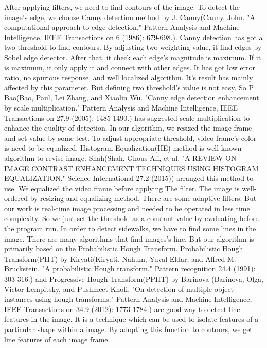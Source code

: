 {After applying filters, we need to find contours of the image. To detect the image's edge, we choose Canny detection method by J. Canny(Canny, John. "A computational approach to edge detection." Pattern Analysis and Machine Intelligence, IEEE Transactions on 6 (1986): 679-698.). Canny detection has got a two threshold to find contours. By adjusting two weighting value, it find edges by Sobel edge detector. After that, it check each edge's magnitude is maximum. If it is maximum, it only apply it and connect with other edges. It has got low error ratio, no spurious response, and well localized algorithm. It's result has mainly affected by this parameter. But defining two threshold's value is not easy. So P Bao(Bao, Paul, Lei Zhang, and Xiaolin Wu. "Canny edge detection enhancement by scale multiplication." Pattern Analysis and Machine Intelligence, IEEE Transactions on 27.9 (2005): 1485-1490.) has suggested scale multiplication to enhance the quality of detection. In our algorithm, we resized the image frame and set value by some test.\newline
To adjust appropriate threshold, video frame's color is need to be equalized. Histogram Equalization(HE) method is well known algorithm to revise image. Shah(Shah, Ghous Ali, et al. "A REVIEW ON IMAGE CONTRAST ENHANCEMENT TECHNIQUES USING HISTOGRAM EQUALIZATION." Science International 27.2 (2015)) arranged this method to use. We equalized the video frame before applying The filter. The image is well-ordered by resizing and equalizing method. There are some adaptive filters. But our work is real-time image processing and needed to be operated in less time complexity. So we just set the threshold as a constant value by evaluating before the program run. \newline
In order to detect sidewalks, we have to find some lines in the image. There are many algorithms that find images's line. But our algorithm is primarily based on the Probabilistic Hough Transform. Probabilistic Hough Transform(PHT) by Kiryati(Kiryati, Nahum, Yuval Eldar, and Alfred M. Bruckstein. "A probabilistic Hough transform." Pattern recognition 24.4 (1991): 303-316.) and Progressive Hough Transform(PPHT) by Barinova (Barinova, Olga, Victor Lempitsky, and Pushmeet Kholi. "On detection of multiple object instances using hough transforms." Pattern Analysis and Machine Intelligence, IEEE Transactions on 34.9 (2012): 1773-1784.) are good way to detcet line features in the image. It is a technique which can be used to isolate features of a particular shape within a image. By adopting this function to contours, we get line features of each image frame. 
}
